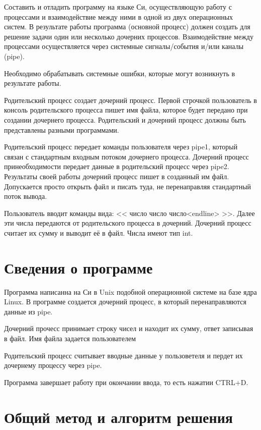 \documentclass[pdf, unicode, 12pt, a4paper,oneside,fleqn]{article}
\begin{document}
Составить и отладить программу на языке Си, осуществляющую работу с процессами и
взаимодействие между ними в одной из двух операционных систем. В результате работы
программа (основной процесс) должен создать для решение задачи один или несколько
дочерних процессов. Взаимодействие между процессами осуществляется через системные
сигналы/события и/или каналы (pipe).

Необходимо обрабатывать системные ошибки, которые могут возникнуть в результате работы.

Родительский процесс создает дочерний процесс. Первой строчкой пользователь в консоль
родительского процесса пишет имя файла, которое будет передано при создании дочернего
процесса. Родительский и дочерний процесс должны быть представлены разными программами.

Родительский процесс передает команды пользователя через pipe1, который связан с
стандартным входным потоком дочернего процесса. Дочерний процесс принеобходимости
передает данные в родительский процесс через pipe2. Результаты своей работы дочерний
процесс пишет в созданный им файл. Допускается просто открыть файл и писать туда, не
перенаправляя стандартный поток вывода.

Пользователь вводит команды вида: << число число число<endline> >>. Далее эти числа 
передаются от родительского процесса в дочерний. Дочерний процесс считает их сумму и 
выводит её в файл. Числа имеют тип int.

\section{Сведения о программе}

Программа написанна на Си в Unix подобной операционной системе на базе ядра Linux.
В программе создается дочерний процесс, в который перенаправляются данные из pipe.

Дочерний прочесс принимает строку чисел и находит их сумму, ответ записывая в файл. Имя файла задается пользователем

Родительский процесс считывает вводные данные у пользоветеля и пердет их дочернему процессу через pipe.

Программа завершает работу при окончании ввода, то есть нажатии CTRL+D.

\section{Общий метод и алгоритм решения}
\end{document}
